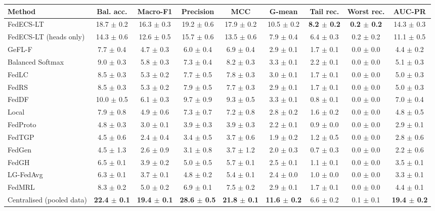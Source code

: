 \begin{tabular}{lcccccccc}
\toprule
Method & Bal. acc. & Macro-F1 & Precision & MCC & G-mean & Tail rec. & Worst rec. & AUC-PR\\
\midrule
FedECS-LT & 18.7 $\pm$ 0.2 & 16.3 $\pm$ 0.3 & 19.2 $\pm$ 0.6 & 17.9 $\pm$ 0.2 & 10.5 $\pm$ 0.2 & \textbf{8.2 $\pm$ 0.2} & \textbf{0.2 $\pm$ 0.2} & 14.3 $\pm$ 0.3\\
FedECS-LT (heads only) & 14.3 $\pm$ 0.6 & 12.6 $\pm$ 0.5 & 15.7 $\pm$ 0.6 & 13.5 $\pm$ 0.6 & 7.9 $\pm$ 0.4 & 6.4 $\pm$ 0.3 & 0.2 $\pm$ 0.2 & 11.1 $\pm$ 0.5\\
GeFL-F & 7.7 $\pm$ 0.4 & 4.7 $\pm$ 0.3 & 6.0 $\pm$ 0.4 & 6.9 $\pm$ 0.4 & 2.9 $\pm$ 0.1 & 1.7 $\pm$ 0.1 & 0.0 $\pm$ 0.0 & 4.4 $\pm$ 0.2\\
Balanced Softmax & 9.0 $\pm$ 0.3 & 5.8 $\pm$ 0.3 & 7.3 $\pm$ 0.4 & 8.2 $\pm$ 0.3 & 3.3 $\pm$ 0.1 & 2.2 $\pm$ 0.1 & 0.0 $\pm$ 0.0 & 5.1 $\pm$ 0.3\\
FedLC & 8.5 $\pm$ 0.3 & 5.3 $\pm$ 0.2 & 7.7 $\pm$ 0.5 & 7.8 $\pm$ 0.3 & 3.0 $\pm$ 0.1 & 1.7 $\pm$ 0.1 & 0.0 $\pm$ 0.0 & 5.0 $\pm$ 0.3\\
FedRS & 8.5 $\pm$ 0.3 & 5.3 $\pm$ 0.2 & 7.9 $\pm$ 0.5 & 7.7 $\pm$ 0.3 & 2.9 $\pm$ 0.1 & 1.7 $\pm$ 0.1 & 0.0 $\pm$ 0.0 & 5.0 $\pm$ 0.3\\
FedDF & 10.0 $\pm$ 0.5 & 6.1 $\pm$ 0.3 & 9.7 $\pm$ 0.9 & 9.3 $\pm$ 0.5 & 3.3 $\pm$ 0.1 & 0.8 $\pm$ 0.1 & 0.0 $\pm$ 0.0 & 7.0 $\pm$ 0.4\\
Local & 7.9 $\pm$ 0.8 & 4.9 $\pm$ 0.6 & 7.3 $\pm$ 0.7 & 7.2 $\pm$ 0.8 & 2.8 $\pm$ 0.2 & 1.6 $\pm$ 0.2 & 0.0 $\pm$ 0.0 & 4.8 $\pm$ 0.5\\
FedProto & 4.8 $\pm$ 0.3 & 3.0 $\pm$ 0.1 & 3.9 $\pm$ 0.3 & 3.9 $\pm$ 0.3 & 2.2 $\pm$ 0.1 & 0.9 $\pm$ 0.0 & 0.0 $\pm$ 0.0 & 2.9 $\pm$ 0.1\\
FedTGP & 4.5 $\pm$ 0.6 & 2.4 $\pm$ 0.4 & 3.4 $\pm$ 0.5 & 3.7 $\pm$ 0.6 & 1.9 $\pm$ 0.2 & 1.2 $\pm$ 0.5 & 0.0 $\pm$ 0.0 & 2.8 $\pm$ 0.6\\
FedGen & 4.5 $\pm$ 1.3 & 2.6 $\pm$ 0.9 & 3.1 $\pm$ 0.8 & 3.7 $\pm$ 1.2 & 2.0 $\pm$ 0.3 & 0.7 $\pm$ 0.3 & 0.0 $\pm$ 0.0 & 2.2 $\pm$ 0.6\\
FedGH & 6.5 $\pm$ 0.1 & 3.9 $\pm$ 0.2 & 5.0 $\pm$ 0.5 & 5.7 $\pm$ 0.1 & 2.5 $\pm$ 0.1 & 1.1 $\pm$ 0.1 & 0.0 $\pm$ 0.0 & 3.5 $\pm$ 0.1\\
LG-FedAvg & 6.3 $\pm$ 0.1 & 3.7 $\pm$ 0.1 & 4.8 $\pm$ 0.2 & 5.4 $\pm$ 0.1 & 2.4 $\pm$ 0.0 & 1.0 $\pm$ 0.0 & 0.0 $\pm$ 0.0 & 3.3 $\pm$ 0.1\\
FedMRL & 8.3 $\pm$ 0.2 & 5.0 $\pm$ 0.2 & 6.9 $\pm$ 0.1 & 7.5 $\pm$ 0.2 & 2.9 $\pm$ 0.1 & 1.7 $\pm$ 0.1 & 0.0 $\pm$ 0.0 & 4.4 $\pm$ 0.1\\
Centralised (pooled data) & \textbf{22.4 $\pm$ 0.1} & \textbf{19.4 $\pm$ 0.1} & \textbf{28.6 $\pm$ 0.5} & \textbf{21.8 $\pm$ 0.1} & \textbf{11.6 $\pm$ 0.2} & 6.6 $\pm$ 0.2 & 0.1 $\pm$ 0.1 & \textbf{19.4 $\pm$ 0.2}\\
\bottomrule
\end{tabular}
